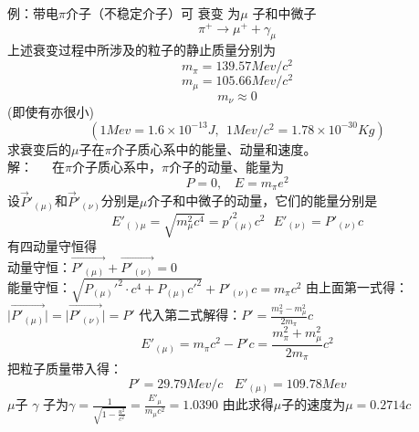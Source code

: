 例：带电$\pi$介子（不稳定介子）可 衰变  为$\mu$  子和中微子
$$\pi^{+}\rightarrow\mu^{+}+\gamma_{\mu}$$
上述衰变过程中所涉及的粒子的静止质量分别为
$$
m_{\pi}=139.57Mev/c^{2}$$$$m_{\mu}=105.66Mev/c^{2}$$$$m_{\nu}\approx0 $$(即使有亦很小)
$$(1Mev=1.6\times10^{-13}J,\ \ 1Mev/c^{2}=1.78\times10^{-30}Kg)$$
求衰变后的$\mu$子在$\pi$介子质心系中的能量、动量和速度。\\
解：\ \ \ 在$\pi$介子质心系中，$\pi$介子的动量、能量为
$$P=0,\ \ \ \ E=m_{\pi}e^{2}$$
设$\overrightarrow{P}'_{(\mu)}$和$\overrightarrow{P}'_{(\nu)}$分别是$\mu$介子和中微子的动量，它们的能量分别是
$$E'_{()\mu}=\sqrt{m^{2}_{\mu}c^{4}}=p'^{2}_{(\mu)}c^{2}\ \ \ E'_{(\nu)}=P'_{(\nu)}c$$
有四动量守恒得\\
动量守恒：$\overrightarrow{P'_{(\mu)}}+\overrightarrow{P'_{(\nu)}}=0$\\
能量守恒：$\sqrt{P_{(\mu)}'^{2}\cdot c^{4}+P_{(\mu)}c'^{2}}+P'_{(\nu)}c=m_{\pi}c^{2}$
由上面第一式得：$\mid \overrightarrow{P'_{(\mu)}}\mid=\mid \overrightarrow{P'_{(\nu)}}\mid=P'$
代入第二式解得：$P'=\frac{m_{\pi}^{2}-m_{\mu}^{2}}{2m_{\pi}}c$
$$E'_{(\mu)}=m_{\pi}c^{2}-P'c=\frac{m_{\pi}^{2}+m_{\mu}^{2}}{2m_{\pi}}c^{2}$$
把粒子质量带入得：$$P'=29.79Mev/c\ \ \ \ E'_{(\mu)}=109.78Mev$$
$\mu$子 $\gamma$ 子为$\gamma=\frac{1}{\sqrt{1-\frac{u^{2}}{c^{2}}}}=\frac{E'_{\mu}}{m_{\mu}c^{2}}=1.0390$
由此求得$\mu$子的速度为$\mu=0.2714c$
